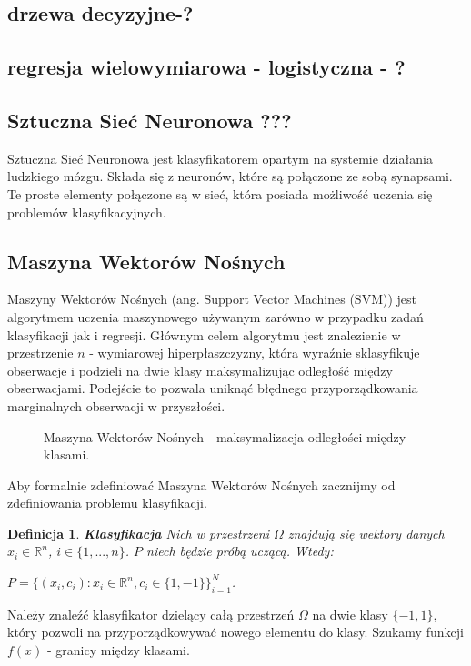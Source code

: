 \documentclass[12pt,a4paper]{report}
\newtheorem{df}{Definicja}[chapter]
\begin{document}
\subsection{drzewa decyzyjne-?}
\subsection{regresja wielowymiarowa - logistyczna - ?}
\subsection{Sztuczna Sieć Neuronowa ???}
Sztuczna Sieć Neuronowa jest klasyfikatorem opartym na systemie działania ludzkiego mózgu. Składa się z neuronów, które są połączone ze sobą synapsami. Te proste elementy połączone są w sieć, która posiada możliwość uczenia się problemów klasyfikacyjnych.

\subsection{Maszyna Wektorów Nośnych}
Maszyny Wektorów Nośnych (ang. Support Vector Machines (SVM)) jest algorytmem uczenia maszynowego używanym zarówno w przypadku zadań klasyfikacji jak i regresji. Głównym celem algorytmu jest znalezienie w przestrzenie $n$ - wymiarowej hiperpłaszczyzny, która wyraźnie sklasyfikuje obserwacje i podzieli na dwie klasy maksymalizując odległość między obserwacjami. Podejście to pozwala uniknąć błędnego przyporządkowania marginalnych obserwacji w przyszłości.
\begin{center}
\begin{figure}[H]
\centering
\caption{Maszyna Wektorów Nośnych - maksymalizacja odległości między klasami.}
\end{figure}
\end{center}
Aby formalnie zdefiniować Maszyna Wektorów Nośnych zacznijmy od zdefiniowania problemu klasyfikacji.
\begin{df}\textbf{Klasyfikacja}
Nich w przestrzeni $\Omega$ znajdują się wektory danych $x_i \in \mathbb{R}^n$, $i\in \{1,...,n\}$. $P$ niech będzie próbą uczącą.
Wtedy:
\begin{center}
$P = \{(x_i,c_i): x_i \in \mathbb{R}^n, c_i \in \{1,-1\}\}_{i=1}^N$.
\end{center}
\end{df}
\bigskip
Należy znaleźć klasyfikator dzielący całą przestrzeń $\Omega$ na dwie klasy $\{-1,1\}$, który pozwoli na przyporządkowywać nowego elementu do klasy. Szukamy funkcji $f(x)$ - granicy między klasami.
\end{document}
